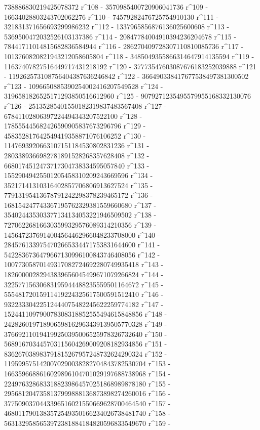        738886830219425078372 r^108 - 3570985400720906041736 r^109 - 
       16634028803243702062276 r^110 - 
       74579282476725754910130 r^111 - 
       321831371656693299986232 r^112 - 
       1337965856876136025600608 r^113 - 
       5369500472032526103137386 r^114 - 
       20847784004910394236204678 r^115 - 
       78441711014815682836584944 r^116 - 
       286270409728307110810085736 r^117 - 
       1013760820821943212058605804 r^118 - 
       3485049355866314647914135594 r^119 - 
       11637407827516449717431218192 r^120 - 
       37773547603087676183252039888 r^121 - 
       119262573108756404387636246842 r^122 - 
       366490338417677538497381300502 r^123 - 
       1096650885390254002416207549528 r^124 - 
       3196581826525171293850516612960 r^125 - 
       9079271235495579955168332130076 r^126 - 
       25135285401550182319837483567408 r^127 - 
       67841102806397224494343207522100 r^128 - 
       178555445682426590905837673296796 r^129 - 
       458352817642549419358871076106252 r^130 - 
       1147693920663107151184530802831236 r^131 - 
       2803389366982781891528268357628408 r^132 - 
       6680174512473717304738334595057840 r^133 - 
       15529049425501205458310209243669596 r^134 - 
       35217141310316402857706806913627524 r^135 - 
       77913195413678791242298378239465172 r^136 - 
       168154247743367195762329381559660680 r^137 - 
       354024435303377134134053221946509502 r^138 - 
       727062268166303599329576089314210356 r^139 - 
       1456472376914004564462966048233708000 r^140 - 
       2845761339754702665334471753831644600 r^141 - 
       5422836736479667130996100843746408056 r^142 - 
       10077305870149317082724692280749935418 r^143 - 
       18260000282943839656045499671079266824 r^144 - 
       32257715630683195944488235559501164672 r^145 - 
       55548172015911419224325617500591512410 r^146 - 
       93223330422512444075482245622259774182 r^147 - 
       152441109790078308318852555494615848856 r^148 - 
       242826019718906598162963439139505770328 r^149 - 
       376692110194199250395006525978326732640 r^150 - 
       568916703445703115604269009208182934856 r^151 - 
       836267038983791815267957248732624290324 r^152 - 
       1195995751420070290038282704843782530704 r^153 - 
       1663596688616029896104701029197688738968 r^154 - 
       2249763286833188239864570251868989878180 r^155 - 
       2956812047358137999888136873898274260016 r^156 - 
       3775090370443396516021550669628700464540 r^157 - 
       4680117901383572549350166234026738481740 r^158 - 
       5631329585653972381884184820596833549670 r^159 - 
